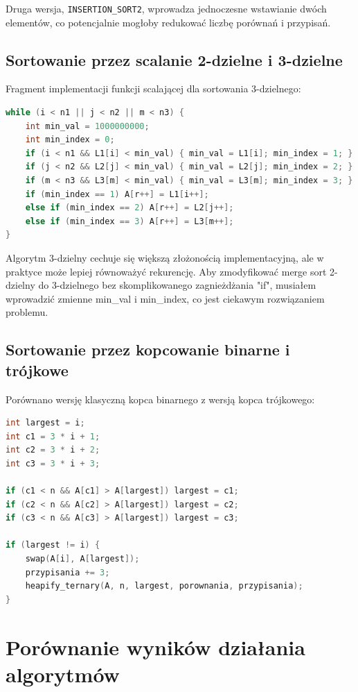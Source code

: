 \documentclass[12pt,a4paper]{article}
\begin{document}
Druga wersja, \texttt{INSERTION\_SORT2}, wprowadza jednoczesne wstawianie dwóch elementów, co potencjalnie mogłoby redukować liczbę porównań i przypisań.

\subsection{Sortowanie przez scalanie 2-dzielne i 3-dzielne}
Fragment implementacji funkcji scalającej dla sortowania 3-dzielnego:
\begin{lstlisting}[language=C++,caption={Fragment funkcji MERGE3}]
while (i < n1 || j < n2 || m < n3) {
    int min_val = 1000000000;
    int min_index = 0;
    if (i < n1 && L1[i] < min_val) { min_val = L1[i]; min_index = 1; }
    if (j < n2 && L2[j] < min_val) { min_val = L2[j]; min_index = 2; }
    if (m < n3 && L3[m] < min_val) { min_val = L3[m]; min_index = 3; }
    if (min_index == 1) A[r++] = L1[i++];
    else if (min_index == 2) A[r++] = L2[j++];
    else if (min_index == 3) A[r++] = L3[m++];
}
\end{lstlisting}
Algorytm 3-dzielny cechuje się większą złożonością implementacyjną, ale w praktyce może lepiej równoważyć rekurencję. Aby zmodyfikować merge sort 2-dzielny do 3-dzielnego bez skomplikowanego zagnieżdżania "if", musiałem wprowadzić zmienne min\_val i min\_index, co jest ciekawym rozwiązaniem problemu.

\subsection{Sortowanie przez kopcowanie binarne i trójkowe}
Porównano wersję klasyczną kopca binarnego z wersją kopca trójkowego:
\begin{lstlisting}[language=C++,caption={Fragment funkcji heapify\_ternary}]
int largest = i;
int c1 = 3 * i + 1;
int c2 = 3 * i + 2;
int c3 = 3 * i + 3;

if (c1 < n && A[c1] > A[largest]) largest = c1;
if (c2 < n && A[c2] > A[largest]) largest = c2;
if (c3 < n && A[c3] > A[largest]) largest = c3;

if (largest != i) {
    swap(A[i], A[largest]);
    przypisania += 3;
    heapify_ternary(A, n, largest, porownania, przypisania);
}
\end{lstlisting}

\section{Porównanie wyników działania algorytmów}
\end{document}
